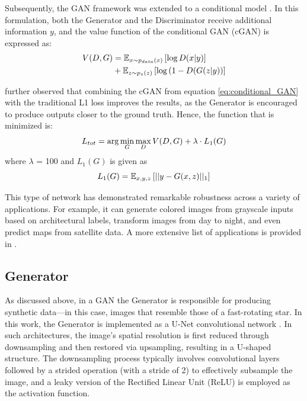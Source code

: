 Subsequently, the GAN framework was extended to a conditional model \citep{mirza2014conditional}. In this formulation, both the Generator and the Discriminator receive additional information $y$, and the value function of the conditional GAN (cGAN) is expressed as:
\begin{equation}
	\centering
	\begin{aligned}
		V(D, G) &= \mathbb{E}_{x \sim p_{data}(x)} \left[ \log D(x|y) \right] \\
		&+ \mathbb{E}_{z \sim p_{z}(z)} \left[ \log \left( 1-D(G(z|y) \right) \right]
	\end{aligned}
	\label{eq:conditional_GAN}
\end{equation}

\cite{isola2017image} further observed that combining the cGAN from equation \ref{eq:conditional_GAN} with the traditional L1 loss improves the results, as the Generator is encouraged to produce outputs closer to the ground truth. Hence, the function that is minimized is:
\begin{equation}
	\centering
	L_{tot} = \arg \min_{G} \max_{D} V(D, G) + \lambda \cdot L_1(G)
	\label{eq:total_gen_loss}
\end{equation}
where $\lambda$ = 100 and $L_1(G)$ is given as
\begin{equation}
	\centering
	L_1(G) = \mathbb{E}_{x,y,z} \left[ ||{y - G(x,z)}||_1 \right]
	\label{eq:l1_loss}
\end{equation}

This type of network has demonstrated remarkable robustness across a variety of applications. For example, it can generate colored images from grayscale inputs based on architectural labels, transform images from day to night, and even predict maps from satellite data. A more extensive list of applications is provided in \cite{isola2017image}.


\subsection{Generator}
As discussed above, in a GAN the Generator is responsible for producing synthetic data—in this case, images that resemble those of a fast-rotating star. In this work, the Generator is implemented as a U-Net convolutional network \citep{ronneberger2015u}. In such architectures, the image's spatial resolution is first reduced through downsampling and then restored via upsampling, resulting in a U-shaped structure. The downsampling process typically involves convolutional layers followed by a strided operation (with a stride of 2) to effectively subsample the image, and a leaky version of the Rectified Linear Unit (ReLU) is employed as the activation function.

